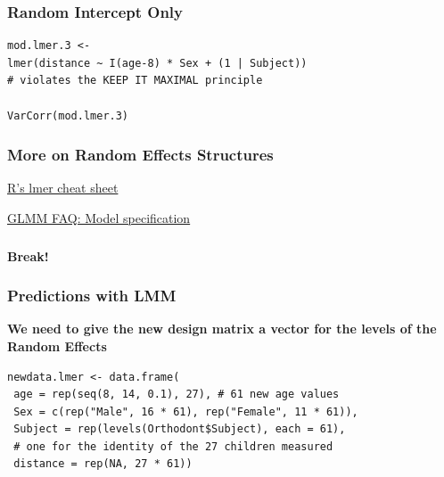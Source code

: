 \documentclass{beamer}
\begin{document}
\begin{frame}[fragile]
    \frametitle{Random Intercept Only}
    
    \small\begin{Verbatim}[frame=single]
mod.lmer.3 <- 
lmer(distance ~ I(age-8) * Sex + (1 | Subject))
# violates the KEEP IT MAXIMAL principle

VarCorr(mod.lmer.3)
    \end{Verbatim}
    \tiny\scalebox{1}{
        
    }
\end{frame}

\begin{frame}[fragile]
    \frametitle{More on Random Effects Structures}
    \Large
    \color{blue}\href{https://stats.stackexchange.com/questions/13166/rs-lmer-cheat-sheet?lq=1}{R's lmer cheat sheet}
    \vspace{0.5cm}
    
    \color{blue}\href{http://bbolker.github.io/mixedmodels-misc/glmmFAQ.html#model-specification}{GLMM FAQ: Model specification}
\end{frame}

\begin{frame}
    \frametitle{}
    \centering
    \huge\color{purple}\textbf{Break!}
\end{frame}

\begin{frame}[fragile]
    \frametitle{Predictions with LMM}
    \textbf{We need to give the new design matrix a vector for the levels of the Random Effects}
    \vspace{0.5cm}
    
    \small\begin{Verbatim}[frame=single]
newdata.lmer <- data.frame(
 age = rep(seq(8, 14, 0.1), 27), # 61 new age values
 Sex = c(rep("Male", 16 * 61), rep("Female", 11 * 61)),
 Subject = rep(levels(Orthodont$Subject), each = 61),
 # one for the identity of the 27 children measured
 distance = rep(NA, 27 * 61))
    \end{Verbatim}
\end{frame}
\end{document}
